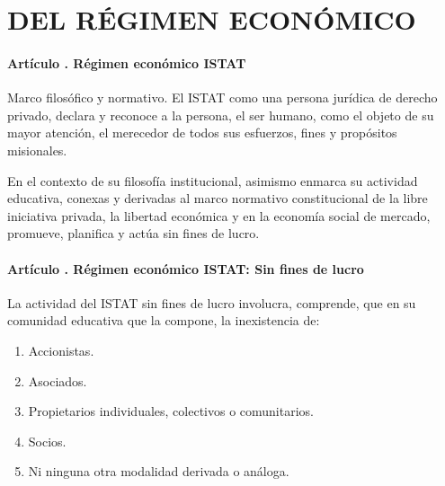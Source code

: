 \part{DEL RÉGIMEN ECONÓMICO }

\subsection{Artículo . Régimen económico ISTAT}
\addtocounter{ns}{1}
Marco filosófico y normativo. El ISTAT como una persona jurídica de derecho privado, declara y reconoce a la persona, el ser humano, como el objeto de su mayor atención, el merecedor de todos sus esfuerzos, fines y propósitos misionales.  

En el contexto de su filosofía institucional, asimismo enmarca su actividad educativa, conexas y derivadas al marco normativo constitucional de la libre iniciativa privada, la libertad económica y en la economía social de mercado, promueve, planifica y actúa sin fines de lucro. 
\subsection{Artículo . Régimen económico ISTAT: Sin fines de lucro}
\addtocounter{ns}{1}
La actividad del ISTAT sin fines de lucro involucra, comprende, que en su comunidad educativa que la compone, la inexistencia de: 
\begin{enumerate}
\item Accionistas. 
\item Asociados. 
\item Propietarios individuales, colectivos o comunitarios. 
\item Socios. 
\item Ni ninguna otra modalidad derivada o análoga.  
\end{enumerate}

